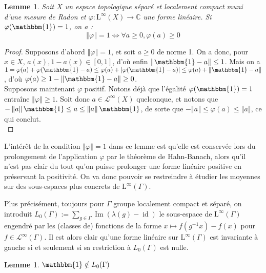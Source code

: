 \documentclass[a4paper,12pt]{article}
\newtheorem{lemma}[theorem]{Lemme}
\newcommand{\C}{\mathbb{C}}
\newcommand{\norm}[1]{\left\Vert #1\right\Vert}
\newcommand{\abs}[1]{\left\vert#1\right\vert}
\newcommand{\indic}{\mathbbm{1}}
\newcommand{\ssi}{si et seulement si }
\newcommand{\inv}{^{-1}}
\renewcommand{\iff}{\Leftrightarrow}
\DeclareMathOperator{\id}{id}
\DeclareMathOperator{\Ima}{Im}
\begin{document}
\begin{lemma}\label{positive_iff_norm}
    Soit $X$ un espace topologique séparé et localement compact muni d'une mesure de Radon et $\varphi:\mathrm{L}^\infty(X)\to\C$ une forme linéaire. 
    Si $\varphi(\indic) = 1$, on a :
    \begin{equation*}
        \norm{\varphi} = 1 \iff \forall a \ge 0, \varphi(a) \geq 0
    \end{equation*}
\end{lemma}

\begin{proof}
    Supposons d'abord $\norm{\varphi} = 1$, et soit $a\ge 0$ de norme 1. On a donc, pour $x\in X$, $a(x), 1-a(x)\in[0,1]$,
    d'où enfin $\norm{\indic-a}\le 1$. Mais on a $1 = \varphi(a) + \varphi(\indic-a) \le \varphi(a) + \abs{\varphi(\indic-a)} \le \varphi(a) + \norm{\indic - a}$, d'où
    $\varphi(a)\ge 1 - \norm{\indic-a}\ge0$. \\
    Supposons maintenant $\varphi$ positif. Notons déjà que l'égalité $\varphi(\indic) = 1$ entraîne $\norm{\varphi}\ge1$. Soit donc $a\in\mathscr{L}^\infty(X)$ quelconque,
    et notons que $-\norm{a}\indic\le a\le\norm{a}\indic$, de sorte que $-\norm{a}\le\varphi(a)\le\norm{a}$, ce qui conclut. \\
\end{proof}

L'intérêt de la condition $\norm\varphi = 1$ dans ce lemme est qu'elle est conservée lors du prolongement de l'application $\varphi$ par le théorème
de Hahn-Banach, alors qu'il n'est pas clair du tout qu'on puisse prolonger une forme linéaire positive en préservant la positivité. On va donc pouvoir se restreindre
à étudier les moyennes sur des sous-espaces plus concrets de $\mathrm{L}^\infty(\Gamma)$.

Plus précisément, toujours pour $\Gamma$ groupe localement compact et séparé, on introduit $L_0(\Gamma) := \sum_{g\in\Gamma} \Ima(\lambda(g) - \id)$ le sous-espace de 
$\mathrm{L}^\infty(\Gamma)$ engendré par les (classes de) fonctions de la forme $x\mapsto f(g\inv x) - f(x)$ pour $f\in\mathscr{L}^\infty(\Gamma)$. 
Il est alors clair qu'une forme linéaire sur $\mathrm{L}^\infty(\Gamma)$ est invariante à gauche \ssi sa restriction à $L_0(\Gamma)$ est nulle. 

\begin{lemma}
    $\indic\notin L_0(\Gamma)$
\end{lemma}
\end{document}
